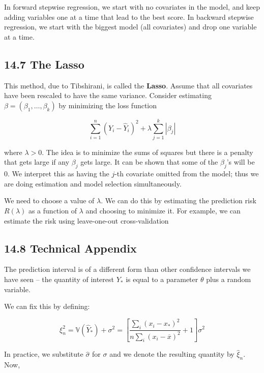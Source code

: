 In forward stepwise regression, we start with no covariates in the
model, and keep adding variables one at a time that lead to the best
score. In backward stepwise regression, we start with the biggest model
(all covariates) and drop one variable at a time.

\subsection{14.7 The Lasso}\label{the-lasso}

This method, due to Tibshirani, is called the \textbf{Lasso}. Assume
that all covariates have been rescaled to have the same variance.
Consider estimating \(\beta = (\beta_1, \dots, \beta_k)\) by minimizing
the loss function

\[ \sum_{i=1}^n (Y_i - \hat{Y}_i)^2 + \lambda \sum_{j=1}^k | \beta_j |\]

where \(\lambda > 0\). The idea is to minimize the sums of squares but
there is a penalty that gets large if any \(\beta_j\) gets large. It can
be shown that some of the \(\beta_j\)'s will be 0. We interpret this as
having the \(j\)-th covariate omitted from the model; thus we are doing
estimation and model selection simultaneously.

We need to choose a value of \(\lambda\). We can do this by estimating
the prediction risk \(R(\lambda)\) as a function of \(\lambda\) and
choosing to minimize it. For example, we can estimate the risk using
leave-one-out cross-validation

\subsection{14.8 Technical Appendix}\label{technical-appendix}

The prediction interval is of a different form than other confidence
intervals we have seen -- the quantity of interest \(Y_*\) is equal to a
parameter \(\theta\) plus a random variable.

We can fix this by defining:

\[ \xi_n^2 = \mathbb{V}(\hat{Y}_*) + \sigma^2 = \left[\frac{\sum_i (x_i - x_*)^2}{n \sum_i (x_i - \overline{x})^2} + 1\right] \sigma^2\]

In practice, we substitute \(\hat{\sigma}\) for \(\sigma\) and we denote
the resulting quantity by \(\hat{\xi}_n\). Now,

